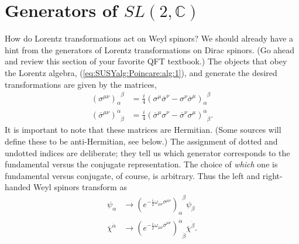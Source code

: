 \documentclass[12pt]{article}
\numberwithin{equation}{section}    %
\begin{document}
\section{Generators of $SL(2,\mathbb{C})$}


How do Lorentz transformations act on Weyl spinors? We should already have a hint from the generators of Lorentz transformations on Dirac spinors. (Go ahead and review this section of your favorite QFT textbook.) The objects that obey the Lorentz algebra,  (\ref{eq:SUSYalg:Poincare:alg:1}), and generate the desired transformations are given by the matrices,
\begin{align}
	(\sigma^{\mu\nu})_\alpha^{\phantom\alpha\beta} &= \frac i4(\sigma^\mu\overline\sigma^\nu-\sigma^\nu\overline\sigma^\mu)_\alpha^{\phantom\alpha\beta}\label{eq:SUSYalg:sigmamunu}\\
	(\overline\sigma^{\mu\nu})^{\dot\alpha}_{\phantom{\dot\alpha}\dot\beta} &= \frac i4 (\overline \sigma^\mu\sigma^\nu - \overline\sigma^\nu\sigma^\mu)^{\dot\alpha}_{\phantom{\dot\alpha}\dot\beta}\label{eq:SUSYalg:sigmabarmunu}.
\end{align}
It is important to note that these matrices are Hermitian. (Some sources will define these to be anti-Hermitian, see below.) The assignment of dotted and undotted indices are deliberate; they tell us which generator corresponds to the fundamental versus the conjugate representation. The choice of \emph{which} one is fundamental versus conjugate, of course, is arbitrary. 
Thus the left and right-handed Weyl spinors transform as
\begin{align}
	\psi_\alpha &\rightarrow \left(e^{-\frac i2 \omega_{\mu\nu}\sigma^{\mu\nu}}\right)_\alpha^{\phantom\alpha\beta}\psi_\beta\label{eq:SUSYalg:alphatransform}\\
	\overline\chi^{\dot\alpha} &\rightarrow \left(e^{-\frac i2 \omega_{\mu\nu}\overline\sigma^{\mu\nu}}\right)^{\dot\alpha}_{\phantom\alpha\dot\beta}\overline\chi^{\dot\beta}.\label{eq:SUSYalg:alphadottransform}
\end{align}
\end{document}
